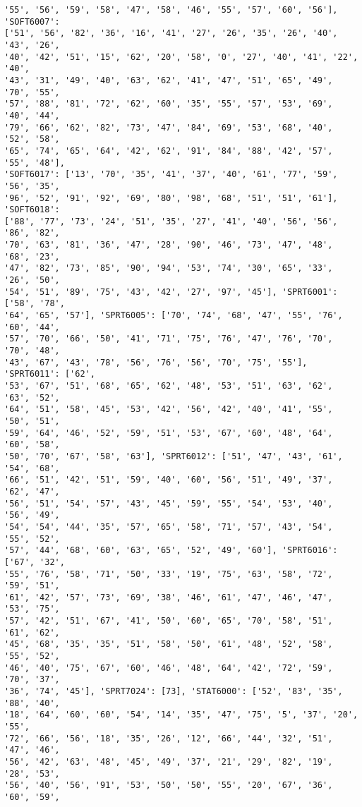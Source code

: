 \documentclass[11pt]{article}
\begin{document}
\begin{Verbatim}[commandchars=\\\{\}]
'55', '56', '59', '58', '47', '58', '46', '55', '57', '60', '56'], 'SOFT6007':
['51', '56', '82', '36', '16', '41', '27', '26', '35', '26', '40', '43', '26',
'40', '42', '51', '15', '62', '20', '58', '0', '27', '40', '41', '22', '40',
'43', '31', '49', '40', '63', '62', '41', '47', '51', '65', '49', '70', '55',
'57', '88', '81', '72', '62', '60', '35', '55', '57', '53', '69', '40', '44',
'79', '66', '62', '82', '73', '47', '84', '69', '53', '68', '40', '52', '58',
'65', '74', '65', '64', '42', '62', '91', '84', '88', '42', '57', '55', '48'],
'SOFT6017': ['13', '70', '35', '41', '37', '40', '61', '77', '59', '56', '35',
'96', '52', '91', '92', '69', '80', '98', '68', '51', '51', '61'], 'SOFT6018':
['88', '77', '73', '24', '51', '35', '27', '41', '40', '56', '56', '86', '82',
'70', '63', '81', '36', '47', '28', '90', '46', '73', '47', '48', '68', '23',
'47', '82', '73', '85', '90', '94', '53', '74', '30', '65', '33', '26', '50',
'54', '51', '89', '75', '43', '42', '27', '97', '45'], 'SPRT6001': ['58', '78',
'64', '65', '57'], 'SPRT6005': ['70', '74', '68', '47', '55', '76', '60', '44',
'57', '70', '66', '50', '41', '71', '75', '76', '47', '76', '70', '70', '48',
'43', '67', '43', '78', '56', '76', '56', '70', '75', '55'], 'SPRT6011': ['62',
'53', '67', '51', '68', '65', '62', '48', '53', '51', '63', '62', '63', '52',
'64', '51', '58', '45', '53', '42', '56', '42', '40', '41', '55', '50', '51',
'59', '64', '46', '52', '59', '51', '53', '67', '60', '48', '64', '60', '58',
'50', '70', '67', '58', '63'], 'SPRT6012': ['51', '47', '43', '61', '54', '68',
'66', '51', '42', '51', '59', '40', '60', '56', '51', '49', '37', '62', '47',
'56', '51', '54', '57', '43', '45', '59', '55', '54', '53', '40', '56', '49',
'54', '54', '44', '35', '57', '65', '58', '71', '57', '43', '54', '55', '52',
'57', '44', '68', '60', '63', '65', '52', '49', '60'], 'SPRT6016': ['67', '32',
'55', '76', '58', '71', '50', '33', '19', '75', '63', '58', '72', '59', '51',
'61', '42', '57', '73', '69', '38', '46', '61', '47', '46', '47', '53', '75',
'57', '42', '51', '67', '41', '50', '60', '65', '70', '58', '51', '61', '62',
'45', '68', '35', '35', '51', '58', '50', '61', '48', '52', '58', '55', '52',
'46', '40', '75', '67', '60', '46', '48', '64', '42', '72', '59', '70', '37',
'36', '74', '45'], 'SPRT7024': [73], 'STAT6000': ['52', '83', '35', '88', '40',
'18', '64', '60', '60', '54', '14', '35', '47', '75', '5', '37', '20', '55',
'72', '66', '56', '18', '35', '26', '12', '66', '44', '32', '51', '47', '46',
'56', '42', '63', '48', '45', '49', '37', '21', '29', '82', '19', '28', '53',
'56', '40', '56', '91', '53', '50', '50', '55', '20', '67', '36', '60', '59',

\end{Verbatim}
\end{document}
